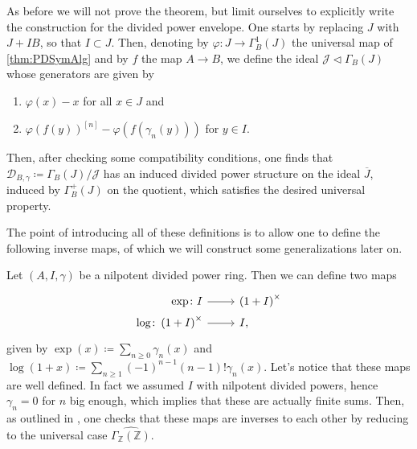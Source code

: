 \begin{rem}[]\label{rem:PDEnvelope}
	As before we will not prove the theorem, but limit
	ourselves to explicitly write the construction for the divided
	power envelope.
	One starts by replacing $J$ with $J + IB$, so that $I \subset J$.
	Then, denoting by $\varphi\colon J \to \Gamma^1_B(J)$ the universal
	map of \cref{thm:PDSymAlg} and by $f$ the map $A \to B$, 
	we define the ideal $\mathcal{J} \triangleleft \Gamma_B(J)$
	whose generators are given by
\begin{enumerate}
	\item $\varphi(x) - x$ for all $x \in J$ and
	\item $\varphi(f(y))^{[n]} - \varphi(f(\gamma_n(y)))$ for $y \in I$.
\end{enumerate}
	Then, after checking some compatibility conditions, one finds that
	$\mathcal{D}_{ B, \gamma } \coloneqq \Gamma_B(J)/\mathcal{J}$ has an induced divided power
	structure on the ideal \(\overline{J}\), induced by \(\Gamma^+_B(J)\) on the quotient,
	which satisfies the desired universal property.
\end{rem}


\noindent
The point of introducing all of these definitions is to allow one to define the following
inverse maps, of which we will construct some generalizations later on.
\begin{defn}[]\label{defn:PDExponential}
	Let $\left(A, I, \gamma\right)$ be a nilpotent divided power ring.
	Then we can define two maps
	\begin{equation*}
	\begin{tikzcd}[row sep = 0ex
		,/tikz/column 1/.append style={anchor=base east}
		,/tikz/column 2/.append style={anchor=base west}]
		\exp\colon I \arrow[r, "", rightarrow] &
		\left( 1 + I \right)^{\times}\\
		\log\colon \left( 1 + I \right)^{\times} \arrow[r, "", rightarrow] &
		I
	,\end{tikzcd}
	\end{equation*} 
	given by 
	$\exp (x) \coloneqq \sum_{n\geq 0} \gamma_n(x)$
	and $\log (1+x) \coloneqq \sum_{n\geq 1} 
	(-1)^{n-1} \left( n-1 \right)! \gamma_n(x)$.
	Let's notice that these maps are well defined.
	In fact we assumed $I$ with nilpotent divided powers,
	hence $\gamma_n = 0$ for $n$ big enough, which implies that
	these are actually finite sums.
	Then, as outlined in \cite[Chapter III, \S1.6]{Messing},
	one checks that these maps are inverses to each other
	by reducing to the universal case $\widehat{\Gamma_{\mathbb{Z}}(\mathbb{Z})}$.
\end{defn}



